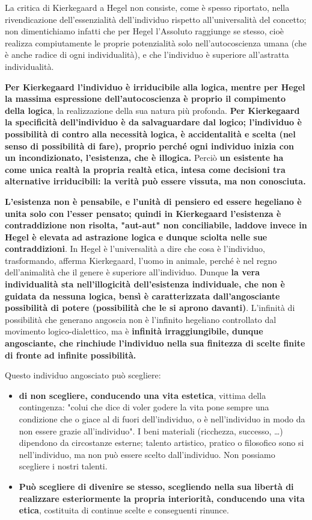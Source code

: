 La critica di Kierkegaard a Hegel non consiste, come è spesso riportato, nella rivendicazione dell'essenzialità dell'individuo rispetto all'universalità del concetto; non dimentichiamo infatti che per Hegel l'Assoluto raggiunge se stesso, cioè realizza compiutamente le proprie potenzialità solo nell'autocoscienza umana (che è anche radice di ogni individualità), e che l'individuo è superiore all'astratta individualità.

 \textbf{Per Kierkegaard l'individuo è irriducibile alla logica, mentre per Hegel la massima espressione dell'autocoscienza è proprio il compimento della logica}, la realizzazione della sua natura più profonda. \textbf{Per Kierkegaard la specificità dell'individuo è da salvaguardare dal logico; l'individuo è possibilità di contro alla necessità logica, è accidentalità e scelta (nel senso di possibilità di fare), proprio perché ogni individuo inizia con un incondizionato, l'esistenza, che è illogica.} Perciò \textbf{un esistente ha come unica realtà la propria realtà etica, intesa come decisioni tra alternative irriducibili: la verità può essere vissuta, ma non conosciuta.} 
 
 \textbf{L'esistenza non è pensabile, e l'unità di pensiero ed essere hegeliano è unita solo con l'esser pensato; quindi in Kierkegaard l'esistenza è contraddizione non risolta, "aut-aut" non conciliabile, laddove invece in Hegel è elevata ad astrazione logica e dunque sciolta nelle sue contraddizioni}. In Hegel è l'universalità  a dire che cosa è l'individuo, trasformando, afferma Kierkegaard, l'uomo in animale, perché è nel regno dell'animalità che il genere è superiore all'individuo. Dunque \textbf{la vera individualità sta nell'illogicità dell'esistenza individuale, che non è guidata da nessuna logica, bensì è caratterizzata dall'angosciante possibilità di potere (possibilità che le si aprono davanti)}. L'infinità di possibilità che generano angoscia non è l'infinito hegeliano controllato dal movimento logico-dialettico, ma è \textbf{infinità irraggiungibile, dunque angosciante, che rinchiude l'individuo nella sua finitezza di scelte finite di fronte ad infinite possibilità.}
 
 Questo individuo angosciato può scegliere:
 
 \begin{itemize}
 	\item \textbf{di non scegliere, conducendo una vita estetica}, vittima della contingenza: "colui che dice di voler godere la vita pone sempre una condizione che o giace al di fuori dell'individuo, o è nell'individuo in modo da non essere grazie all'individuo". I beni materiali (ricchezza, successo, \dots) dipendono da circostanze esterne; talento artistico, pratico o filosofico sono si nell'individuo, ma non può essere scelto dall'individuo. Non possiamo scegliere i nostri talenti.
 	\item \textbf{Può scegliere di divenire se stesso, scegliendo nella sua libertà di realizzare esteriormente la propria interiorità, conducendo una vita etica}, costituita di continue scelte e conseguenti rinunce.
 \end{itemize}

